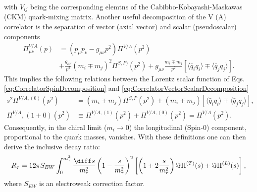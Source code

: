 with $V_{ij}$ being the corresponding elemtns of the Cabibbo-Kobayashi-Maskawas (CKM) quark-mixing matrix.
Another useful decomposition of the V (A) correlator is the separation of vector (axial vector) and scalar (pseudoscalar) components
\begin{equation} \label{eq:CorrelatorVectorScalarDecomposition}
	\begin{split}
	\Pi_{\mu\nu}^{V/A}(p) &= (p_\mu p_\nu - g_{\mu\nu} p^2)\Pi^{V/A} (p^2) \\
	&+ \frac{g_{\mu\nu}}{p^2}(m_i \mp m_j)^2 \Pi^{S,P)}(p^2) + g_{\mu\nu} \frac{m_i \mp m_j}{p^2} [ \langle \bar q_i q_i \rangle \mp \langle \bar q_j q_j\rangle ].
	\end{split}
\end{equation}	
This implies the following relations between the Lorentz scalar function of Eqs. \eqref{eq:CorrelatorSpinDecomposition} and \eqref{eq:CorrelatorVectorScalarDecomposition}
\begin{align}
	s^2 \Pi^{V/A,(0)} (p^2) &= (m_i \mp m_j)\Pi^{S,P}(p^2) + (m_i \mp m_j)[\langle \bar q_i q_i \rangle \mp \langle\bar q_j q_j \rangle], \\
	\Pi^{V/A}, (1+0) (p^2) &\equiv \Pi^{V/A,(1)}(p^2) + \Pi^{V/A, (0)}(p^2) = \Pi^{V/A}(p^2).
\end{align}
Consequently, in the chiral limit ($m_i \to 0$) the longitudinal (Spin-0) component, proportional to the quark masses, vanishes.
With these definitions one can then derive the inclusive decay ratio:
\begin{equation}
	\label{eq:tauDecayRatio}
	R_\tau = 12 \pi S_{EW} \int_0^{m_\tau^2} \frac{\diff s}{m_\tau^2} \left(1 - \frac{s}{m_\tau^2} \right)^2 \left[ \left( 1 + 2 \frac{s}{m_\tau^2} \right) \Im \Pi^{(T)} (s) + \Im \Pi^{(L)} (s) \right],
\end{equation}
where $S_{EW}$ is an electroweak correction factor.

